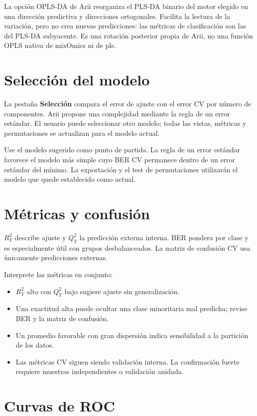 \documentclass[11pt,a4paper,openany]{report}
\newcommand{\menu}[1]{\textbf{#1}}
\begin{document}
La opción OPLS-DA de Arii reorganiza el PLS-DA binario del motor elegido en una dirección
predictiva y direcciones ortogonales. Facilita la lectura de la variación, pero
no crea nuevas predicciones: las métricas de clasificación son las del PLS-DA
subyacente. Es una rotación posterior propia de Arii, no una función OPLS nativa
de mixOmics ni de pls.

\section{Selección del modelo}

La pestaña \menu{Selección} compara el error de ajuste con el error CV por número de componentes. Arii propone una complejidad mediante la regla de un error estándar. El usuario puede seleccionar otro modelo; todas las vistas, métricas y permutaciones se actualizan para el modelo actual.

Use el modelo sugerido como punto de partida. La regla de un error estándar favorece el modelo más simple cuyo BER CV permanece dentro de un error estándar del mínimo. La exportación y el test de permutaciones utilizarán el modelo que quede establecido como actual.

\section{Métricas y confusión}

$R^2_Y$ describe ajuste y $Q^2_Y$ la predicción externa interna. BER pondera por clase y es especialmente útil con grupos desbalanceados. La matriz de confusión CV usa únicamente predicciones externas.

Interprete las métricas en conjunto:

\begin{itemize}
  \item $R^2_Y$ alto con $Q^2_Y$ bajo sugiere ajuste sin generalización.
  \item Una exactitud alta puede ocultar una clase minoritaria mal predicha;
  revise BER y la matriz de confusión.
  \item Un promedio favorable con gran dispersión indica sensibilidad a la
  partición de los datos.
  \item Las métricas CV siguen siendo validación interna. La confirmación fuerte
  requiere muestras independientes o validación anidada.
\end{itemize}

\section{Curvas de ROC}
\end{document}
